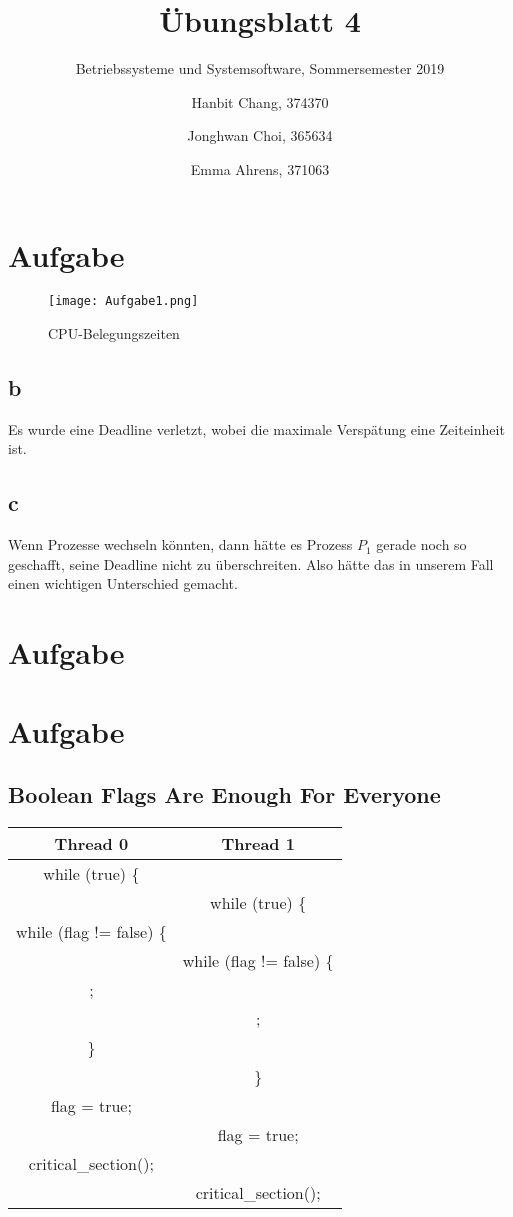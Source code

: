 \documentclass{scrartcl}
\title{Übungsblatt 4}
\subtitle{Betriebssysteme und Systemsoftware, Sommersemester 2019}
\author{ Hanbit Chang, 374370 \and Jonghwan Choi, 365634 \and Emma Ahrens, 371063}
\begin{document}
\maketitle

\section{Aufgabe}

\begin{figure}[ht]
	\centering
	\texttt{[image: Aufgabe1.png]}
	\caption{CPU-Belegungszeiten}
\end{figure}

\subsection{b}

Es wurde eine Deadline verletzt, wobei die maximale Verspätung eine
Zeiteinheit ist.

\subsection{c}

Wenn Prozesse wechseln könnten, dann hätte es Prozess $P_1$ gerade noch so
geschafft, seine Deadline nicht zu überschreiten. Also hätte das in unserem
Fall einen wichtigen Unterschied gemacht.


\section{Aufgabe}


\section{Aufgabe}

\subsection{Boolean Flags Are Enough For Everyone}

\begin{center}
\begin{tabular}{ c | c }
 Thread 0 & Thread 1 \\ [0.5ex] \hline \hline
 while (true) \{ & \\ \hline
  & while (true) \{ \\ \hline
 while (flag != false) \{ & \\ \hline
  & while (flag != false) \{ \\ \hline
 ; & \\ \hline
  & ; \\ \hline
 \} & \\ \hline
  & \} \\ \hline
 flag = true; & \\ \hline
  & flag = true; \\ \hline
 critical\_section(); & \\ \hline
  & critical\_section(); \\ 
\end{tabular}
\end{center}
\end{document}
